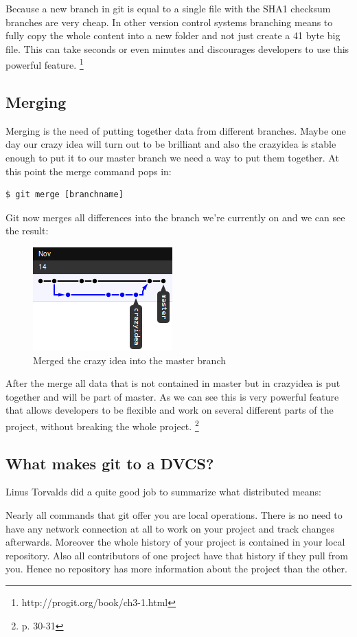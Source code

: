 Because a new branch in git is equal to a single
file with the SHA1 checksum branches are very cheap. In other version control systems branching means to
fully copy the whole content into a new folder and not just create a 41 byte big
file. This can take seconds or even minutes and discourages developers to use
this powerful feature. \footnote{ \cite{gitpro2009} http://progit.org/book/ch3-1.html }

\subsection {Merging}

Merging is the need of putting together data from different branches. Maybe one
day our crazy idea will turn out to be brilliant and also the crazyidea is
stable enough to put it to our master branch we need a way to put them together.
At this point the merge command pops in:

\begin{lstlisting}
$ git merge [branchname]
\end{lstlisting}

Git now merges all differences into the branch we're currently on and we can see
the result:
\begin{figure}[h]
  \centering 
  \includegraphics{img/merge1}
  \caption{Merged the crazy idea into the master branch}
  \label{}
\end{figure}

After the merge all data that is not contained in master but in crazyidea is put
together and will be part of master. As we can see this is very powerful feature
that allows developers to be flexible and work on several different parts of the
project, without breaking the whole project. \footnote{ \cite{gitinternals2008}
p. 30-31}

\subsection {What makes git to a DVCS?}

Linus Torvalds did a quite good job to summarize what distributed means:

 \cite{googletechtalk2007}

Nearly all commands that git offer you are local operations. There is no need to
have any network connection at all to work on your project and track changes
afterwards. Moreover the whole history of your project is contained in your
local repository. Also all contributors of one project have that history if
they pull from you. Hence no repository has more information about the project
than the other.

